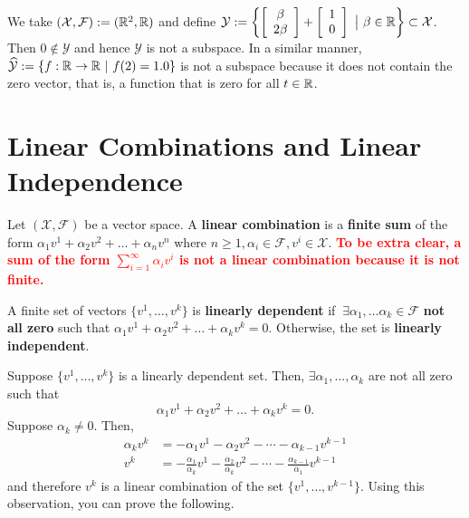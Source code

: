 \vspace*{.2cm}

\begin{nonexample}
 We take $(\mathcal{X}, \mathcal{F}):= (\mathbb R^2, \mathbb R)$ and define 
$\mathcal{Y} := \left\{ \left[ \begin{array}{c} \beta\\ 2 \beta \end{array} \right] + \left[ \begin{array}{c} 1\\ 0 \end{array} \right]~ \big|~ \beta \in \mathbb R \right\}\subset \mathcal{X}$. Then $0 \not \in \mathcal{Y}$ and hence $\mathcal{Y}$ is not a subspace. In a similar manner, $ \widehat{\mathcal{Y}} := \left\{ f: \mathbb R \to \mathbb R ~|~ f(2)=1.0 \right\}$ is not a subspace because it does not contain the zero vector, that is, a function that is zero for all $t\in \mathbb R$.
    
\end{nonexample}


\section{Linear Combinations and Linear Independence}

\begin{definition} Let $(\mathcal{X},\mathcal{F})$ be a vector space. A \textbf{linear combination} is a \textbf{finite sum} of the form $\alpha_1v^1+\alpha_2v^2+\ldots+\alpha_nv^n$ where $n\geq 1, \alpha_i \in \mathcal{F}, v^i\in\mathcal{X}$. \textcolor{red}{\bf To be extra clear, a sum of the form $\sum_{i=1}^{\infty} \alpha_i v^i$ is not a linear combination because it is not finite.} 
\end{definition}

\begin{definition} A finite set of vectors $\{v^1, \dots, v^k\}$ is \textbf{linearly dependent} if $~\exists\alpha_1, \ldots \alpha_k\in\mathcal{F}$ \textbf{not all zero} such that $\alpha_1v^1+\alpha_2v^2+\ldots+\alpha_kv^k=0$. Otherwise, the set is \textbf{linearly independent}.
\end{definition}


\begin{rem} Suppose $\{v^1, \dots, v^k\}$ is a linearly dependent set. Then, $\exists\alpha_1, \dots, \alpha_k$ are not all zero such that $$\alpha_1v^1+\alpha_2v^2+\ldots+\alpha_kv^k=0.$$
Suppose $\alpha_k\neq0$. Then,
    \begin{align*}
    \alpha_kv^k &= -\alpha_1v^1-\alpha_2v^2-\cdots-\alpha_{k-1}v^{k-1}\\
    v^k &= -\frac{\alpha_1}{\alpha_k}v^1-\frac{\alpha_2}{\alpha_k}v^2-\cdots-\frac{\alpha_{k-1}}{\alpha_1}v^{k-1}
    \end{align*}
    and therefore $v^k$ is a linear combination of the set $\{v^1,\ldots,v^{k-1}\}$. Using this observation, you can prove the following.

\end{rem}     

